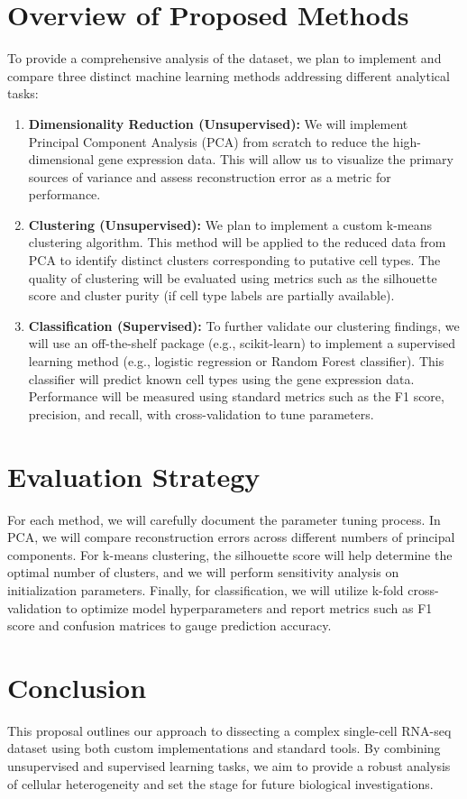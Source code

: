 \documentclass[12pt,letterpaper]{article}
\begin{document}
\section*{Overview of Proposed Methods}
To provide a comprehensive analysis of the dataset, we plan to implement and compare three distinct machine learning methods addressing different analytical tasks:
\begin{enumerate}[label=\arabic*.]
    \item \textbf{Dimensionality Reduction (Unsupervised):} We will implement Principal Component Analysis (PCA) from scratch to reduce the high-dimensional gene expression data. This will allow us to visualize the primary sources of variance and assess reconstruction error as a metric for performance.
    
    \item \textbf{Clustering (Unsupervised):} We plan to implement a custom k-means clustering algorithm. This method will be applied to the reduced data from PCA to identify distinct clusters corresponding to putative cell types. The quality of clustering will be evaluated using metrics such as the silhouette score and cluster purity (if cell type labels are partially available).
    
    \item \textbf{Classification (Supervised):} To further validate our clustering findings, we will use an off-the-shelf package (e.g., scikit-learn) to implement a supervised learning method (e.g., logistic regression or Random Forest classifier). This classifier will predict known cell types using the gene expression data. Performance will be measured using standard metrics such as the F1 score, precision, and recall, with cross-validation to tune parameters.
\end{enumerate}

\section*{Evaluation Strategy}
For each method, we will carefully document the parameter tuning process. In PCA, we will compare reconstruction errors across different numbers of principal components. For k-means clustering, the silhouette score will help determine the optimal number of clusters, and we will perform sensitivity analysis on initialization parameters. Finally, for classification, we will utilize k-fold cross-validation to optimize model hyperparameters and report metrics such as F1 score and confusion matrices to gauge prediction accuracy.

\section*{Conclusion}
This proposal outlines our approach to dissecting a complex single-cell RNA-seq dataset using both custom implementations and standard tools. By combining unsupervised and supervised learning tasks, we aim to provide a robust analysis of cellular heterogeneity and set the stage for future biological investigations.
\end{document}
